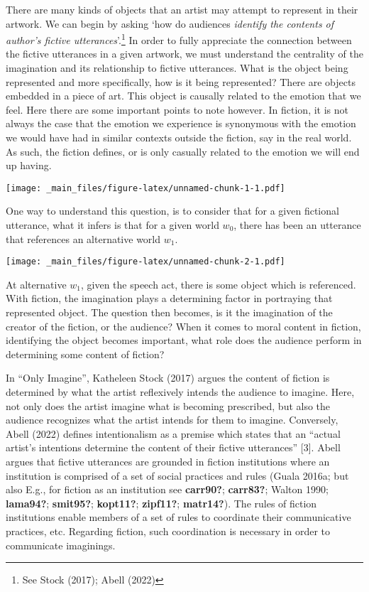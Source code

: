 \documentclass[12pt]{book}
\theoremstyle{definition}
\theoremstyle{remark}
\newcommand{\pandocbounded}[1]{#1}
\begin{document}
There are many kinds of objects that an artist may attempt to represent in their artwork. We can begin by asking `how do audiences \emph{identify the contents of author's fictive utterances}'.\footnote{See Stock (2017); Abell (2022)} In order to fully appreciate the connection between the fictive utterances in a given artwork, we must understand the centrality of the imagination and its relationship to fictive utterances. What is the object being represented and more specifically, how is it being represented? There are objects embedded in a piece of art. This object is causally related to the emotion that we feel. Here there are some important points to note however. In fiction, it is not always the case that the emotion we experience is synonymous with the emotion we would have had in similar contexts outside the fiction, say in the real world. As such, the fiction defines, or is only casually related to the emotion we will end up having.

\pandocbounded{\texttt{[image: \_main\_files/figure-latex/unnamed-chunk-1-1.pdf]}}

One way to understand this question, is to consider that for a given fictional utterance, what it infers is that for a given world \(w_0\), there has been an utterance that references an alternative world \(w_1\).

\pandocbounded{\texttt{[image: \_main\_files/figure-latex/unnamed-chunk-2-1.pdf]}}

At alternative \(w_1\), given the speech act, there is some object which is referenced. With fiction, the imagination plays a determining factor in portraying that represented object. The question then becomes, is it the imagination of the creator of the fiction, or the audience? When it comes to moral content in fiction, identifying the object becomes important, what role does the audience perform in determining some content of fiction?

In ``Only Imagine'', Katheleen Stock (2017) argues the content of fiction is determined by what the artist reflexively intends the audience to imagine. Here, not only does the artist imagine what is becoming prescribed, but also the audience recognizes what the artist intends for them to imagine. Conversely, Abell (2022) defines intentionalism as a premise which states that an ``actual artist's intentions determine the content of their fictive utterances'' {[}3{]}. Abell argues that fictive utterances are grounded in fiction institutions where an institution is comprised of a set of social practices and rules (Guala 2016a; but also E.g., for fiction as an institution see \textbf{carr90?}; \textbf{carr83?}; Walton 1990; \textbf{lama94?}; \textbf{smit95?}; \textbf{kopt11?}; \textbf{zipf11?}; \textbf{matr14?}). The rules of fiction institutions enable members of a set of rules to coordinate their communicative practices, etc. Regarding fiction, such coordination is necessary in order to communicate imaginings.
\end{document}
